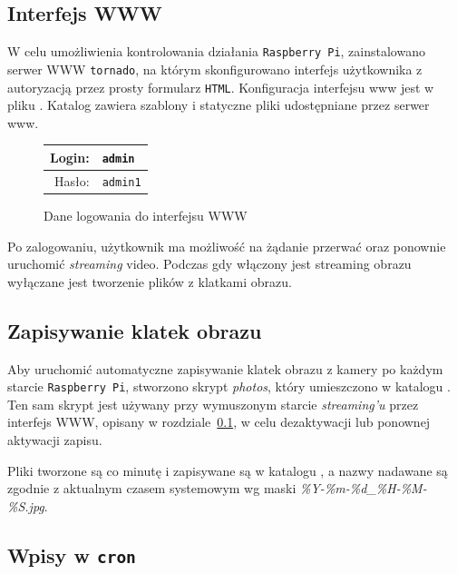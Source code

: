 \documentclass{article}
\begin{document}
\subsection{Interfejs WWW}
\label{sec:www}

W celu umożliwienia kontrolowania działania \texttt{Raspberry~Pi}, zainstalowano serwer WWW \texttt{tornado}, na którym skonfigurowano interfejs użytkownika z autoryzacją przez prosty formularz \texttt{HTML}. Konfiguracja interfejsu www jest w pliku . Katalog  zawiera szablony i statyczne pliki udostępniane przez serwer www.
\begin{figure}[H]
\centering
\begin{tabular}{r|l}
Login: & \texttt{admin}\\
\hline
Hasło: & \texttt{admin1}\\
\end{tabular}
\caption{Dane logowania do interfejsu WWW}
\end{figure}
Po zalogowaniu, użytkownik ma możliwość na żądanie przerwać oraz ponownie uruchomić \emph{streaming} video. Podczas gdy włączony jest streaming obrazu wyłączane jest tworzenie plików z klatkami obrazu.


\subsection{Zapisywanie klatek obrazu}

Aby uruchomić automatyczne zapisywanie klatek obrazu z kamery po każdym starcie \texttt{Raspberry~Pi}, stworzono skrypt \emph{photos}, który umieszczono w katalogu . Ten sam skrypt jest używany przy wymuszonym starcie \emph{streaming'u} przez interfejs WWW, opisany w rozdziale~\ref{sec:www}, w celu dezaktywacji lub ponownej aktywacji zapisu.

Pliki tworzone są co minutę i zapisywane są w katalogu , a nazwy nadawane są zgodnie z aktualnym czasem systemowym wg maski \emph{\%Y-\%m-\%d\_\%H-\%M-\%S.jpg}.


\subsection{Wpisy w \texttt{cron}}
\end{document}
